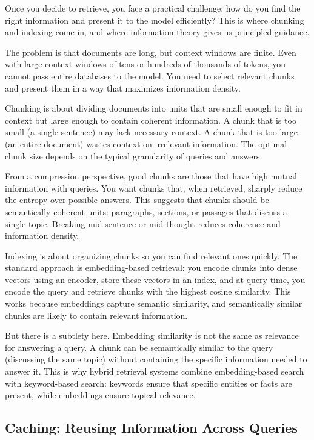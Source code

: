 Once you decide to retrieve, you face a practical challenge: how do you find the right information and present it to the model efficiently? This is where chunking and indexing come in, and where information theory gives us principled guidance.

The problem is that documents are long, but context windows are finite. Even with large context windows of tens or hundreds of thousands of tokens, you cannot pass entire databases to the model. You need to select relevant chunks and present them in a way that maximizes information density.

Chunking is about dividing documents into units that are small enough to fit in context but large enough to contain coherent information. A chunk that is too small (a single sentence) may lack necessary context. A chunk that is too large (an entire document) wastes context on irrelevant information. The optimal chunk size depends on the typical granularity of queries and answers.

From a compression perspective, good chunks are those that have high mutual information with queries. You want chunks that, when retrieved, sharply reduce the entropy over possible answers. This suggests that chunks should be semantically coherent units: paragraphs, sections, or passages that discuss a single topic. Breaking mid-sentence or mid-thought reduces coherence and information density.

Indexing is about organizing chunks so you can find relevant ones quickly. The standard approach is embedding-based retrieval: you encode chunks into dense vectors using an encoder, store these vectors in an index, and at query time, you encode the query and retrieve chunks with the highest cosine similarity. This works because embeddings capture semantic similarity, and semantically similar chunks are likely to contain relevant information.

But there is a subtlety here. Embedding similarity is not the same as relevance for answering a query. A chunk can be semantically similar to the query (discussing the same topic) without containing the specific information needed to answer it. This is why hybrid retrieval systems combine embedding-based search with keyword-based search: keywords ensure that specific entities or facts are present, while embeddings ensure topical relevance.

\vspace{1em}

\subsection{Caching: Reusing Information Across Queries}

